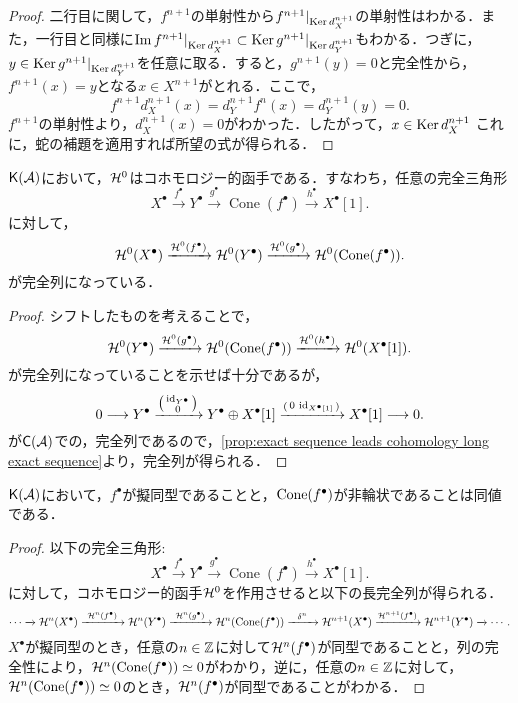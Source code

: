 \begin{proof}
二行目に関して，$f^{n+1}$の単射性から$f^{n+1}|_{\operatorname{Ker} d_X^{n+1}}$の単射性はわかる．また，一行目と同様に$\Im f^{n+1}|_{\operatorname{Ker} d_X^{n+1}} \subset \operatorname{Ker} g^{n+1}|_{\operatorname{Ker} d_Y^{n+1}}$もわかる．つぎに，$y\in\operatorname{Ker} g^{n+1}|_{\operatorname{Ker} d_Y^{n+1}}$を任意に取る．すると，$g^{n+1}(y)=0$と完全性から，$f^{n+1}(x)=y$となる$x\in X^{n+1}$がとれる．ここで，
\[f^{n+1}d_X^{n+1}(x) = d_Y^{n+1}f^n(x) = d_Y^{n+1}(y) = 0.\]
$f^{n+1}$の単射性より，$d_X^{n+1}(x)=0$がわかった．したがって，$x\in\operatorname{Ker} d_X^{n+1}$
	これに，蛇の補題を適用すれば所望の式が得られる．
\end{proof}

\begin{prop}
	$\mathsf{K}({\mathcal A})$において，${\mathcal H}^0$はコホモロジー的函手である．すなわち，任意の完全三角形
  \[
		X^\bullet \xrightarrow{f^\bullet} Y^\bullet \xrightarrow{g^\bullet} \operatorname{Cone}(f^\bullet) \xrightarrow{h^\bullet} X^\bullet[1].
  \]
	に対して，
  \[
		{\mathcal H}^0(X^\bullet)\xrightarrow{{\mathcal H}^0(f^\bullet)}{\mathcal H}^0(Y^\bullet)\xrightarrow{{\mathcal H}^0(g^\bullet)}{\mathcal H}^0(\operatorname{\mathrm{Cone}}(f^\bullet)).
  \]
	が完全列になっている．
\end{prop}
\begin{proof}
	シフトしたものを考えることで，
  \[
		{\mathcal H}^0(Y^\bullet)\xrightarrow{{\mathcal H}^0(g^\bullet)}{\mathcal H}^0(\operatorname{\mathrm{Cone}}(f^\bullet))\xrightarrow{{\mathcal H}^0(h^\bullet)}{\mathcal H}^0(X^\bullet[1]).
  \]
	が完全列になっていることを示せば十分であるが，
  \[
		0\longrightarrow Y^\bullet \xrightarrow{\left(\begin{smallmatrix}\mathrm{id}_{Y^\bullet}\\ 0\end{smallmatrix}\right)}Y^\bullet \oplus X^\bullet[1] \xrightarrow{\left(\begin{smallmatrix}0 & \mathrm{id}_{X^\bullet[1]}\end{smallmatrix}\right)} X^\bullet[1]\longrightarrow 0.
  \]
	が$\mathsf{C}({\mathcal A})$での，完全列であるので，\ref{prop:exact sequence leads cohomology long exact sequence}より，完全列が得られる．
\end{proof}
\begin{lemm}
	$\mathsf{K}({\mathcal A})$において，$f^\bullet$が擬同型であることと，$\operatorname{\mathrm{Cone}}(f^\bullet)$が非輪状であることは同値である．
\end{lemm}
\begin{proof}
以下の完全三角形:
  \[
		X^\bullet \xrightarrow{f^\bullet} Y^\bullet \xrightarrow{g^\bullet} \operatorname{Cone}(f^\bullet) \xrightarrow{h^\bullet} X^\bullet[1].
  \]
に対して，コホモロジー的函手${\mathcal H}^0$を作用させると以下の長完全列が得られる．
\[\cdots\xrightarrow{}\H^n(X^\bullet)\xrightarrow{\ \H^{n}(f^\bullet)\ } \H^n(Y^\bullet)\xrightarrow{\ \H^{n}(g^\bullet)\ } \H^n(\Cone(f^\bullet))\xrightarrow{\ \ \delta^n\ \ } \H^{n+1}(X^\bullet) \xrightarrow{\H^{n+1}(f^\bullet)} \H^{n+1}(Y^\bullet)\xrightarrow{}\cdots .\]
$X^\bullet$が擬同型のとき，任意の$n\in{\mathbb Z}$に対して${\mathcal H}^n(f^\bullet)$が同型であることと，列の完全性により，${\mathcal H}^n(\operatorname{\mathrm{Cone}}(f^\bullet))\simeq 0$がわかり，逆に，任意の$n\in{\mathbb Z}$に対して，${\mathcal H}^n(\operatorname{\mathrm{Cone}}(f^\bullet))\simeq 0$のとき，${\mathcal H}^n(f^\bullet)$が同型であることがわかる．
\end{proof}

